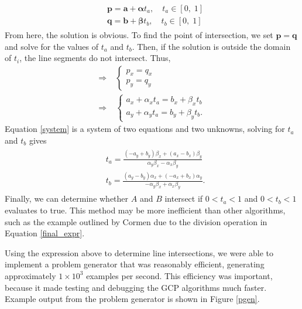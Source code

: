 \documentclass{article}
\newcommand{\ve}[1]{\boldsymbol{\mathbf{#1}}}
\begin{document}
		\begin{align}
			\begin{split}
				& \ve{p} = \ve{a} + \ve{\alpha} t_a, \quad t_a \in [0, \; 1]\\
				& \ve{q} = \ve{b} + \ve{\beta} t_b, \quad t_b \in [0, \; 1]
			\end{split}
		\end{align}
		From here, the solution is obvious. To find the point of intersection, we set $\ve{p} = \ve{q}$ and solve for the values of $t_a$ and $t_b$. Then, if the solution is outside the domain of $t_i$, the line segments do not intersect. Thus,
		\begin{align}
			\Rightarrow \; &\begin{cases}
				p_x = q_x \\
				p_y = q_y
			\end{cases} \\
			\Rightarrow \; & \begin{cases}
				a_x + \alpha_x t_a = b_x + \beta_x t_b \\
				a_y + \alpha_y t_a = b_y + \beta_y t_b.
			\end{cases} \label{system}	
		\end{align}
		Equation \ref{system} is a system of two equations and two unknowns, solving for $t_a$ and $t_b$ gives
		\begin{align}
			\begin{split}
				&t_a = \frac{(-a_y + b_y)\beta_x + (a_x - b_x)\beta_y}{\alpha_y \beta_x - \alpha_x \beta_y} \\
				&t_b = \frac{(a_y - b_y)\alpha_x + (-a_x + b_x)\alpha_y}{-\alpha_y \beta_x + \alpha_x \beta_y}.
			\end{split} \label{final_expr}
		\end{align}
		Finally, we can determine whether $A$ and $B$ intersect if $0 < t_a < 1$ and $0 < t_b < 1$ evaluates to true. This method may be more inefficient than other algorithms, such as the example outlined by Cormen\cite{structs} due to the division operation in Equation \ref{final_expr}. \par 
		Using the expression above to determine line intersections, we were able to implement a problem generator that was reasonably efficient, generating approximately $1\times10^3$ examples per second. This efficiency was important, because it made testing and debugging the GCP algorithms much faster. Example output from the problem generator is shown in Figure \ref{pgen}.
		
\end{document}
